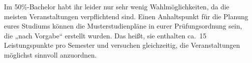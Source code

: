 Im 50\%-Bachelor habt ihr leider nur sehr wenig Wahlmöglichkeiten, da die
meisten Veranstaltungen verpflichtend sind.  Einen Anhaltspunkt für die Planung
eures Studiums können die Musterstudienpläne in eurer Prüfungsordnung sein, die
„nach Vorgabe“ erstellt wurden. Das heißt, sie enthalten ca.\ 15
Leistungspunkte pro Semester und versuchen gleichzeitig, die Veranstaltungen
möglichst sinnvoll anzuordnen.
